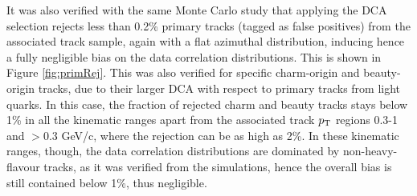 It was also verified with the same Monte Carlo study that applying the DCA selection rejects less than 0.2\% primary tracks (tagged as false positives) from the associated track sample, again with a flat azimuthal distribution, inducing hence a fully negligible bias on the data correlation distributions. This is shown in Figure \ref{fig:primRej}. This was also verified for specific charm-origin and beauty-origin tracks, due to their larger DCA with respect to primary tracks from light quarks. In this case, the fraction of rejected charm and beauty tracks stays below 1\% in all the kinematic ranges apart from the associated track $p_{\rm T}$ regions 0.3-1 and $>0.3$ GeV/c, where the rejection can be as high as 2\%. In these kinematic ranges, though, the data correlation distributions are dominated by non-heavy-flavour tracks, as it was verified from the simulations, hence the overall bias is still contained below 1\%, thus negligible.

